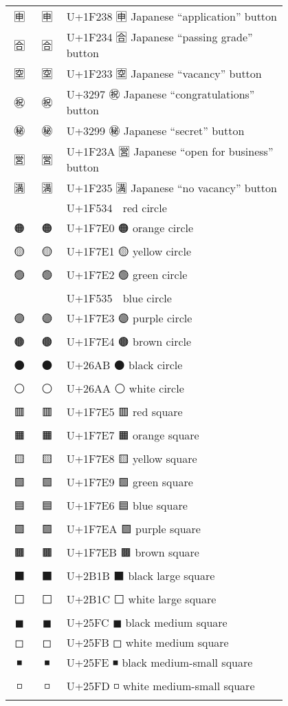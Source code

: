 \documentclass[a4paper,12pt]{ltjarticle}
\newcommand{\fontA}[1]{{\fontspec[RawFeature={mode=harf,+dist,+ccmp}]{Segoe UI Emoji} #1}}
\newcommand{\fontB}[1]{{\fontspec[RawFeature={mode=harf,+dist,+ccmp}]{Noto Color Emoji} #1}}
\begin{document}
\begin{longtable}[c]{ccp{0.8\linewidth}}
\fontA{🈸}&\fontB{🈸}&U+1F238 🈸 Japanese “application” button\\
\fontA{🈴}&\fontB{🈴}&U+1F234 🈴 Japanese “passing grade” button\\
\fontA{🈳}&\fontB{🈳}&U+1F233 🈳 Japanese “vacancy” button\\
\fontA{㊗}&\fontB{㊗}&U+3297 ㊗ Japanese “congratulations” button\\
\fontA{㊙}&\fontB{㊙}&U+3299 ㊙ Japanese “secret” button\\
\fontA{🈺}&\fontB{🈺}&U+1F23A 🈺 Japanese “open for business” button\\
\fontA{🈵}&\fontB{🈵}&U+1F235 🈵 Japanese “no vacancy” button\\
\fontA{🔴}&\fontB{🔴}&U+1F534 🔴 red circle\\
\fontA{🟠}&\fontB{🟠}&U+1F7E0 🟠 orange circle\\
\fontA{🟡}&\fontB{🟡}&U+1F7E1 🟡 yellow circle\\
\fontA{🟢}&\fontB{🟢}&U+1F7E2 🟢 green circle\\
\fontA{🔵}&\fontB{🔵}&U+1F535 🔵 blue circle\\
\fontA{🟣}&\fontB{🟣}&U+1F7E3 🟣 purple circle\\
\fontA{🟤}&\fontB{🟤}&U+1F7E4 🟤 brown circle\\
\fontA{⚫}&\fontB{⚫}&U+26AB ⚫ black circle\\
\fontA{⚪}&\fontB{⚪}&U+26AA ⚪ white circle\\
\fontA{🟥}&\fontB{🟥}&U+1F7E5 🟥 red square\\
\fontA{🟧}&\fontB{🟧}&U+1F7E7 🟧 orange square\\
\fontA{🟨}&\fontB{🟨}&U+1F7E8 🟨 yellow square\\
\fontA{🟩}&\fontB{🟩}&U+1F7E9 🟩 green square\\
\fontA{🟦}&\fontB{🟦}&U+1F7E6 🟦 blue square\\
\fontA{🟪}&\fontB{🟪}&U+1F7EA 🟪 purple square\\
\fontA{🟫}&\fontB{🟫}&U+1F7EB 🟫 brown square\\
\fontA{⬛}&\fontB{⬛}&U+2B1B ⬛ black large square\\
\fontA{⬜}&\fontB{⬜}&U+2B1C ⬜ white large square\\
\fontA{◼}&\fontB{◼}&U+25FC ◼ black medium square\\
\fontA{◻}&\fontB{◻}&U+25FB ◻ white medium square\\
\fontA{◾}&\fontB{◾}&U+25FE ◾ black medium-small square\\
\fontA{◽}&\fontB{◽}&U+25FD ◽ white medium-small square\\

\end{longtable}
\end{document}

